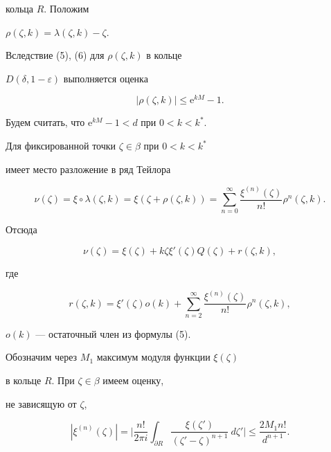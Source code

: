 \begin{pf}
кольца $R$. Положим 


$\rho(\zeta,k)=\lambda(\zeta,k)-\zeta$.


Вследствие (5), (6) для $\rho(\zeta,k)$ в кольце


$D(\delta,1-\varepsilon)$ выполняется оценка


\begin{equation}


|\rho(\zeta,k)|\le \mathrm e^{kM}-1.


\end{equation}


Будем считать, что $\mathrm e^{kM}-1<d$ при $0<k<k^{*}$. 


Для фиксированной точки $\zeta\in \beta$ при $0<k<k^{*}$


имеет место разложение в ряд Тейлора


\begin{equation}


\nu(\zeta)=\xi\circ\lambda(\zeta,k)=\xi(\zeta+\rho(\zeta,k))=


\sum_{n=0}^{\infty}\frac{\xi^{(n)}(\zeta)}{n!}\rho^{n}(\zeta,k).


\end{equation}


Отсюда


\begin{equation}


\nu(\zeta)=\xi(\zeta)+k\zeta\xi'(\zeta)Q(\zeta)+r(\zeta,k),


\end{equation}


где


$$


r(\zeta,k)=\xi'(\zeta) o(k)+


\sum_{n=2}^{\infty}\frac{\xi^{(n)}(\zeta)}{n!}\rho^{n}(\zeta,k),


$$


$o(k)$ --- остаточный член из формулы (5).


Обозначим через $M_{1}$ максимум модуля функции $\xi(\zeta)$


в кольце $R$. При $\zeta\in \beta$ имеем оценку,


не зависящую от $\zeta$, 


\begin{equation}


|\xi^{(n)}(\zeta)|=\bigg|\frac{n!}{2\pi i}\int_{\partial R}


\frac{\xi(\zeta')}{(\zeta'-\zeta)^{n+1}}~d\zeta'\bigg|


\le \frac{2M_{1}n!}{d^{n+1}}.



\end{equation}
\end{pf}
